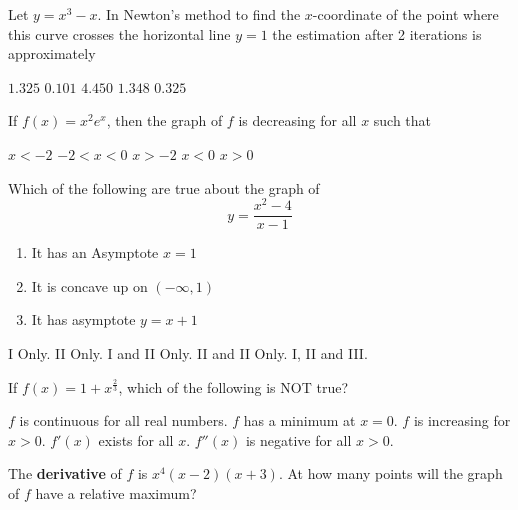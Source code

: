 \begin{questions}
\question[2] Let $y = x^3 - x$. In Newton's method to find the
    $x$-coordinate of the point where this curve crosses the
    horizontal line $y = 1$ the estimation after 2 iterations is
    approximately
    
    \begin{oneparchoices}
    \CorrectChoice $1.325$
    \choice $0.101$
    \choice $4.450$
    \choice $1.348$
    \choice $0.325$
    \end{oneparchoices}

\question[2] If $f(x) = x^2e^x$, then the graph of $f$ is decreasing
    for all $x$ such that

    \begin{oneparchoices}
    \choice $x < -2$
    \CorrectChoice $-2 < x < 0$
    \choice $x > -2$
    \choice $x < 0$
    \choice $x > 0$
    \end{oneparchoices}

\question[2] Which of the following are true about the graph of $$y
    = \frac{x^2 - 4}{x - 1}$$

    \begin{enumerate}
    \item It has an Asymptote $x = 1$
    \item It is concave up on $(-\infty, 1)$
    \item It has asymptote $y = x + 1$
    \end{enumerate}

    \begin{oneparchoices}
    \choice I Only.
    \choice II Only.
    \choice I and II Only.
    \choice II and II Only.
    \CorrectChoice I, II and III.
    \end{oneparchoices}

\question[2] If $f(x) = 1 + x^{\frac{2}{3}}$, which of the following
    is NOT true?

    \begin{oneparchoices}
    \choice $f$ is continuous for all real numbers.
    \choice $f$ has a minimum at $x = 0$.
    \choice $f$ is increasing for $x > 0$.
    \CorrectChoice $f'(x)$ exists for all $x$.
    \choice $f''(x)$ is negative for all $x > 0$.
    \end{oneparchoices}

\question[2] The {\bf derivative} of $f$ is $x^4(x - 2)(x + 3)$. At
    how many points will the graph of $f$ have a relative maximum?


\end{questions}
